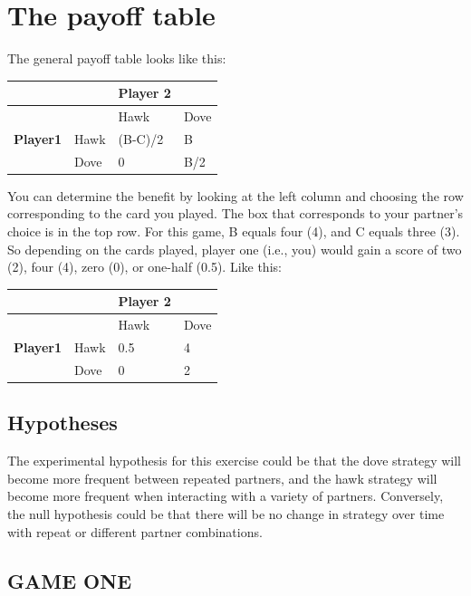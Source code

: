 \documentclass[
  a4paper]{book}
\begin{document}
\section{The payoff table}\label{the-payoff-table}

The general payoff table looks like this:

\begin{longtable}[]{@{}llll@{}}
\toprule\noalign{}
& & Player 2 & \\
\midrule\noalign{}
\endhead
\bottomrule\noalign{}
\endlastfoot
& & Hawk & Dove \\
\textbf{Player1} & Hawk & (B-C)/2 & B \\
& Dove & 0 & B/2 \\
\end{longtable}

You can determine the benefit by looking at the left column and choosing the row corresponding to the card you played. The box that corresponds to your partner's choice is in the top row. For this game, B equals four (4), and C equals three (3). So depending on the cards played, player one (i.e., you) would gain a score of two (2), four (4), zero (0), or one-half (0.5). Like this:

\begin{longtable}[]{@{}llll@{}}
\toprule\noalign{}
& & Player 2 & \\
\midrule\noalign{}
\endhead
\bottomrule\noalign{}
\endlastfoot
& & Hawk & Dove \\
\textbf{Player1} & Hawk & 0.5 & 4 \\
& Dove & 0 & 2 \\
\end{longtable}

\subsection{Hypotheses}\label{hypotheses}

The experimental hypothesis for this exercise could be that the dove strategy will become more frequent between repeated partners, and the hawk strategy will become more frequent when interacting with a variety of partners. Conversely, the null hypothesis could be that there will be no change in strategy over time with repeat or different partner combinations.

\subsection{GAME ONE}\label{game-one}
\end{document}
